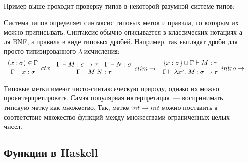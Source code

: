\documentclass[12pt]{article}
\begin{document}
    Пример выше проходит проверку типов в некоторой разумной системе типов:
    \begin{figure}[h]
        \centering
    \end{figure}

    Система типов определяет синтаксис типовых меток и правила, по которым их можно приписывать.
    Синтаксис обычно описывается в классических нотациях а ля BNF, а правила в виде типовых дробей.
    Например, так выглядят дроби для просто-типизированного $\lambda$-исчисления:
    \[
        \begin{array}{l c r}
            \infer[ctx]{\Gamma \vdash x: \sigma}{(x: \sigma) \in \Gamma}
            &
            \infer[elim\to]{\Gamma \vdash M\;N : \tau}{\Gamma \vdash M : \sigma \to \tau & \Gamma \vdash N : \sigma}
            &
            \infer[intro\to]{\Gamma \vdash \lambda x^{\color{red} \sigma}\ldotp M : \sigma \to \tau}{\{x : \sigma\} \cup \Gamma \vdash M : \tau}
        \end{array}
    \]

    Типовые метки имеют чисто-синтаксическую природу, однако их можно проинтерпретировать.
    Самая популярная интерпретация~--- воспринимать типовую метку как множество.
    Так, метке $int \to int$ можно поставить в соответствие множество функций между множествами ограниченных целых чисел.

    \subsection{Функции в Haskell}
\end{document}
